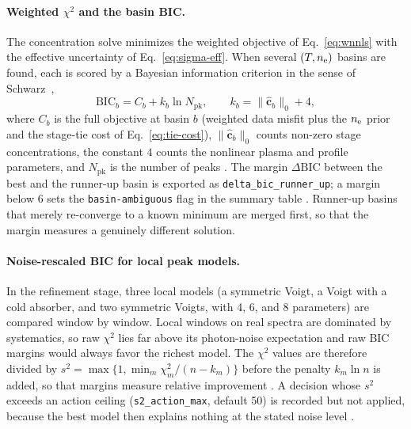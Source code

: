 \paragraph{Weighted $\chi^2$ and the basin BIC.}
The concentration solve minimizes the weighted objective of Eq.~\eqref{eq:wnnls} with the effective uncertainty of Eq.~\eqref{eq:sigma-eff}. When several $(T,n_{\mathrm{e}})$ basins are found, each is scored by a Bayesian information criterion in the sense of Schwarz~\cite{schwarz1978bic},
\begin{equation}
  \label{eq:basin-bic}
  \mathrm{BIC}_b = C_b + k_b \ln N_\mathrm{pk},
  \qquad k_b = \lVert\hat{\mathbf{c}}_b\rVert_0 + 4,
\end{equation}
where $C_b$ is the full objective at basin $b$ (weighted data misfit plus the $n_{\mathrm{e}}$ prior and the stage-tie cost of Eq.~\eqref{eq:tie-cost}), $\lVert\hat{\mathbf{c}}_b\rVert_0$ counts non-zero stage concentrations, the constant $4$ counts the nonlinear plasma and profile parameters, and $N_\mathrm{pk}$ is the number of peaks %
. The margin $\Delta\mathrm{BIC}$ between the best and the runner-up basin is exported as \texttt{delta\_bic\_runner\_up}; a margin below 6 sets the \texttt{basin-ambiguous} flag in the summary table %
. Runner-up basins that merely re-converge to a known minimum are merged first, so that the margin measures a genuinely different solution.

\paragraph{Noise-rescaled BIC for local peak models.}
In the refinement stage, three local models (a symmetric Voigt, a Voigt with a cold absorber, and two symmetric Voigts, with 4, 6, and 8 parameters) are compared window by window. Local windows on real spectra are dominated by systematics, so raw $\chi^2$ lies far above its photon-noise expectation and raw BIC margins would always favor the richest model. The $\chi^2$ values are therefore divided by $s^2=\max\{1,\min_m \chi^2_m/(n-k_m)\}$ before the penalty $k_m\ln n$ is added, so that margins measure relative improvement %
. A decision whose $s^2$ exceeds an action ceiling (\texttt{s2\_action\_max}, default 50) is recorded but not applied, because the best model then explains nothing at the stated noise level %
.

